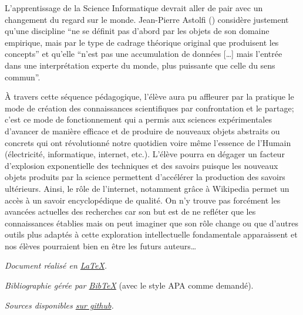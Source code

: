 \documentclass[11pt,bibliography=totoc]{scrartcl}
\begin{document}
L'apprentissage de la Science Informatique devrait aller de pair avec un
changement du regard sur le monde. Jean-Pierre Astolfi (\cite{astolfi})
considère justement qu'une discipline ``ne se définit pas d'abord par les objets
de son domaine empirique, mais par le type de cadrage théorique original que
produisent les concepts'' et qu'elle ``n'est pas une accumulation de données
[\ldots] mais l'entrée dans une interprétation experte du monde, plus puissante
que celle du sens commun''.

À travers cette séquence pédagogique, l'élève aura pu affleurer par la pratique
le mode de création des connaissances scientifiques par confrontation et
le partage; c'est ce mode de fonctionnement qui a permis aux sciences
expérimentales d'avancer de manière efficace et de produire de nouveaux objets
abstraits ou concrets qui ont révolutionné notre quotidien voire même l'essence
de l'Humain (électricité, informatique, internet, etc.). L'élève pourra en
dégager un facteur d'explosion exponentielle des techniques et des savoirs
puisque les nouveaux objets produits par la science permettent d'accélérer la
production des savoirs ultérieurs. Ainsi, le rôle de l'internet, notamment grâce
à Wikipedia permet un accès à un savoir encyclopédique de qualité. On n'y trouve
pas forcément les avancées actuelles des recherches car son but est de ne
refléter que les connaissances établies mais on peut imaginer que son rôle
change ou que d'autres outils plus adaptés à cette exploration intellectuelle
fondamentale apparaissent et nos élèves pourraient bien en être les futurs
auteurs\ldots

\printbibliography  %
\vfill
\emph{Document réalisé en \href{https://www.latex-project.org/}{\LaTeX}.}\par
\emph{Bibliographie gérée par \href{http://www.bibtex.org/}{Bib\TeX}} {\small
(avec le style APA comme demandé).}\par
\emph{Sources disponibles \href{https://github.com/Dalker/didac_010}{sur
    github}.}
\end{document}
